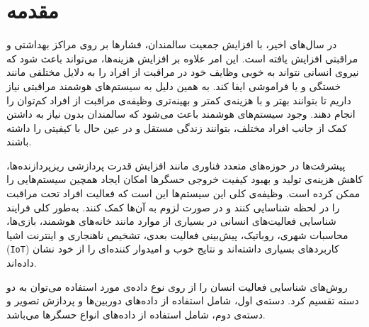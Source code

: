 \chapter{مقدمه}

در سال‌های اخیر، با افزایش جمعیت سالمندان، فشارها بر روی مراکز بهداشتی و مراقبتی افزایش یافته است. این امر علاوه بر افزایش هزینه‌ها، می‌تواند باعث شود که نیروی انسانی نتواند به خوبی وظایف خود در مراقبت از افراد را به دلایل مختلفی مانند خستگی و یا فراموشی ایفا کند. به همین دلیل به سیستم‌های هوشمند مراقبتی نیاز داریم تا بتوانند بهتر و با هزینه‌ی کمتر و بهینه‌تری وظیفه‌ی مراقبت از افراد کم‌توان را انجام دهند. وجود سیستم‌های هوشمند باعث می‌شود که سالمندان بدون نیاز به داشتن کمک از جانب افراد مختلف، بتوانند زندگی مستقل و در عین حال با کیفیتی را داشته باشند.

پیشرفت‌ها در حوزه‌های متعدد فناوری مانند افزایش قدرت پردازشی ریزپردازنده‌ها، کاهش هزینه‌ی تولید و بهبود کیفیت خروجی حسگرها امکان ایجاد همچین سیستم‌هایی را ممکن کرده است. وظیفه‌ی کلی این سیستم‌ها این است که فعالیت افراد تحت مراقبت را در لحظه شناسایی کنند و در صورت لزوم به آن‌ها کمک کنند. به‌طور کلی فرایند شناسایی فعالیت‌های انسانی در بسیاری از موارد مانند خانه‌های هوشمند\cite{alaghbari2022activities,liao2014detecting}،
بازی‌ها\cite{almeida2017activity}،
محاسبات شهری\cite{zambonelli2011pervasive}،
روباتیک\cite{pereyda2019cyber}،
پیش‌بینی فعالیت بعدی\cite{alaghbari2022activities,jaouedi2020prediction}،
تشخیص ناهنجاری\cite{alaghbari2022activities,zhu2015wearable}
و اینترنت اشیا (\verb;IoT;)\cite{lu2018wearable}
کاربردهای بسیاری داشته‌اند و نتایج خوب و امیدوار کننده‌ای را از خود نشان داده‌اند.

روش‌های شناسایی فعالیت انسان
را از روی نوع داده‌ی مورد استفاده می‌توان به دو دسته تقسیم کرد. دسته‌ی اول، شامل استفاده از داده‌های دوربین‌ها و پردازش تصویر و دسته‌ی دوم، شامل استفاده از داده‌های انواع حسگرها می‌باشد.

